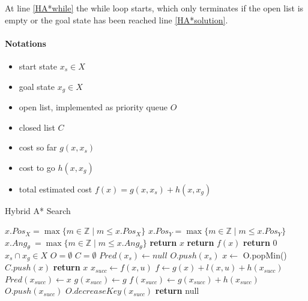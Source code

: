At line \ref{HA*while} the while loop starts, which only terminates if the open list is empty or the goal state has been reached line \ref{HA*solution}.

\paragraph{Notations}
\begin{itemize}
    \item start state $x_s \in X$
    \item goal state $x_g \in X$
    \item open list, implemented as priority queue $O$
    \item closed list $C$
    \item cost so far $g(x,x_s)$
    \item cost to go $h(x,x_g)$
    \item total estimated cost $f(x) = g(x,x_s) + h(x,x_g)$
\end{itemize}

\begin{algorithm}
    \caption{Hybrid A* Search}\label{HA*}
    \begin{algorithmic}[1]
            \State $x.Pos_X = \max\{m\in\mathbb{Z}\mid m\le x.Pos_X\}$
            \State $x.Pos_Y = \max\{m\in\mathbb{Z}\mid m\le x.Pos_Y\}$
            \State $x.Ang_\theta\ =\max\{m\in\mathbb{Z}\mid m\le x.Ang_\theta\}$
            \State \textbf{return} $x$
        \EndFunction
        \Statex
                \State \textbf{return} $f(x)$
            \Else
                \State \textbf{return} 0
            \EndIf
        \EndFunction
        \Statex
        \Require $x_s \cap x_g \in X$
        \State $O = \emptyset$ \label{HA*start}
        \State $C = \emptyset$
        \State $Pred(x_s) \gets null$
        \State $O.push(x_s)$
         \label{HA*while}
            \State $x \gets$ O.popMin()
            \State $C.push(x)$
                \State \textbf{return} $x$ \label{HA*solution}
            \Else
                \State $x_{succ} \gets f(x,u)$
                        \State $f \gets g(x) + l(x,u) + h(x_{succ})$
                            \State $Pred(x_{succ}) \gets x$
                            \State $g(x_{succ}) \gets g$
                            \State $f(x_{succ}) \gets g(x_{succ}) + h(x_{succ})$
                                \State $O.push(x_{succ})$
                            \Else
                                \State $O.decreaseKey(x_{succ})$
                            \EndIf
                        \EndIf
                    \EndIf
                \EndFor
            \EndIf
        \EndWhile
        \State \textbf{return} null
    \end{algorithmic}
\end{algorithm}
